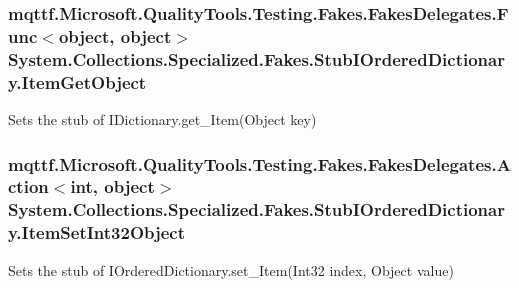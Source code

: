 \hypertarget{class_system_1_1_collections_1_1_specialized_1_1_fakes_1_1_stub_i_ordered_dictionary_a82ab9cfc4c9125f81ed3369560fe7245}{
\subsubsection[{Item\-Get\-Object}]{\setlength{\rightskip}{0pt plus 5cm}mqttf.\-Microsoft.\-Quality\-Tools.\-Testing.\-Fakes.\-Fakes\-Delegates.\-Func$<$object, object$>$ System.\-Collections.\-Specialized.\-Fakes.\-Stub\-I\-Ordered\-Dictionary.\-Item\-Get\-Object}}\label{class_system_1_1_collections_1_1_specialized_1_1_fakes_1_1_stub_i_ordered_dictionary_a82ab9cfc4c9125f81ed3369560fe7245}


Sets the stub of I\-Dictionary.\-get\-\_\-\-Item(\-Object key)

\hypertarget{class_system_1_1_collections_1_1_specialized_1_1_fakes_1_1_stub_i_ordered_dictionary_ac2e95f4fe0e3d604c875ddfc38fef419}{
\subsubsection[{Item\-Set\-Int32\-Object}]{\setlength{\rightskip}{0pt plus 5cm}mqttf.\-Microsoft.\-Quality\-Tools.\-Testing.\-Fakes.\-Fakes\-Delegates.\-Action$<$int, object$>$ System.\-Collections.\-Specialized.\-Fakes.\-Stub\-I\-Ordered\-Dictionary.\-Item\-Set\-Int32\-Object}}\label{class_system_1_1_collections_1_1_specialized_1_1_fakes_1_1_stub_i_ordered_dictionary_ac2e95f4fe0e3d604c875ddfc38fef419}


Sets the stub of I\-Ordered\-Dictionary.\-set\-\_\-\-Item(\-Int32 index, Object value)

